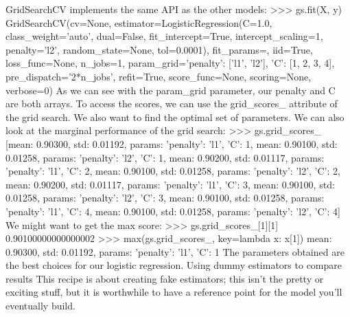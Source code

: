 GridSearchCV implements the same API as the other models:
>>> gs.fit(X, y)
GridSearchCV(cv=None, estimator=LogisticRegression(C=1.0,
class_weight='auto', dual=False, fit_intercept=True,
intercept_scaling=1, penalty='l2', random_state=None,
tol=0.0001), fit_params={}, iid=True, loss_func=None,
n_jobs=1, param_grid={'penalty': ['l1', 'l2'],
'C': [1, 2, 3, 4]}, pre_dispatch='2*n_jobs', refit=True,
score_func=None, scoring=None, verbose=0)
As we can see with the param_grid parameter, our penalty and C are both arrays.
To access the scores, we can use the grid_scores_ attribute of the grid search. We also
want to find the optimal set of parameters. We can also look at the marginal performance
of the grid search:
>>> gs.grid_scores_
[mean: 0.90300, std: 0.01192, params: {'penalty': 'l1', 'C': 1},
mean: 0.90100, std: 0.01258, params: {'penalty': 'l2', 'C': 1},
mean: 0.90200, std: 0.01117, params: {'penalty': 'l1', 'C': 2},
mean: 0.90100, std: 0.01258, params: {'penalty': 'l2', 'C': 2},
mean: 0.90200, std: 0.01117, params: {'penalty': 'l1', 'C': 3},
mean: 0.90100, std: 0.01258, params: {'penalty': 'l2', 'C': 3},
mean: 0.90100, std: 0.01258, params: {'penalty': 'l1', 'C': 4},
mean: 0.90100, std: 0.01258, params: {'penalty': 'l2', 'C': 4}]
We might want to get the max score:
>>> gs.grid_scores_[1][1]
0.90100000000000002
>>> max(gs.grid_scores_, key=lambda x: x[1])
mean: 0.90300, std: 0.01192, params: {'penalty': 'l1', 'C': 1}
The parameters obtained are the best choices for our logistic regression.
Using dummy estimators to compare results
This recipe is about creating fake estimators; this isn't the pretty or exciting stuff, but it is
worthwhile to have a reference point for the model you'll eventually build.
